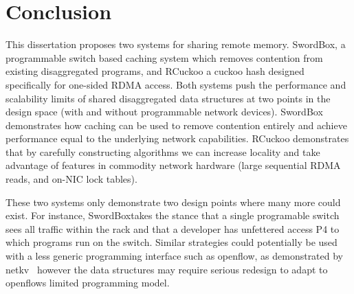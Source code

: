 \documentclass[12pt]{ucsddissertation}
\newcommand{\sword}{SwordBox}
\begin{document}

% 

%


%




\chapter{Conclusion}

This dissertation proposes two systems for sharing remote memory. {\sword}, a programmable switch based
caching system which removes contention from existing disaggregated programs, and RCuckoo a cuckoo
hash designed specifically for one-sided RDMA access. Both systems push the performance and
scalability limits of shared disaggregated data structures at two points in the design space (with
and without programmable network devices). {\sword} demonstrates how caching can be used to remove
contention entirely and achieve performance equal to the underlying network capabilities. RCuckoo
demonstrates that by carefully constructing algorithms we can increase locality and take advantage
of features in commodity network hardware (large sequential RDMA reads, and on-NIC lock tables).

These two systems only demonstrate two design points where many more could exist. For instance,
\sword takes the stance that a single programable switch sees all traffic within the rack and
that a developer has unfettered access P4 to which programs run on the switch. Similar strategies
could potentially be used with a less generic programming interface such as openflow, as
demonstrated by netkv~\cite{netkv} however the data structures may require serious redesign to adapt
to openflows limited programming model.
\end{document}
